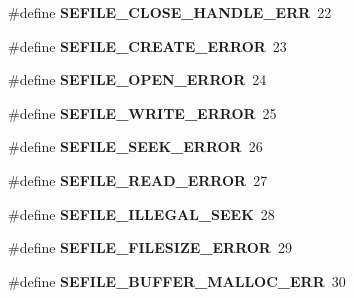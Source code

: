 \begin{DoxyCompactItemize}
\item 
\hypertarget{group__error_values_ga6142dae41abd857c4b8d98e28b33afb7}{\#define {\bfseries S\-E\-F\-I\-L\-E\-\_\-\-C\-L\-O\-S\-E\-\_\-\-H\-A\-N\-D\-L\-E\-\_\-\-E\-R\-R}~22}\label{group__error_values_ga6142dae41abd857c4b8d98e28b33afb7}

\item 
\hypertarget{group__error_values_gab9228a3791ed91c954cb95fb8a022ce4}{\#define {\bfseries S\-E\-F\-I\-L\-E\-\_\-\-C\-R\-E\-A\-T\-E\-\_\-\-E\-R\-R\-O\-R}~23}\label{group__error_values_gab9228a3791ed91c954cb95fb8a022ce4}

\item 
\hypertarget{group__error_values_ga53ed7e1a28f72c836dec4dbde1a863ae}{\#define {\bfseries S\-E\-F\-I\-L\-E\-\_\-\-O\-P\-E\-N\-\_\-\-E\-R\-R\-O\-R}~24}\label{group__error_values_ga53ed7e1a28f72c836dec4dbde1a863ae}

\item 
\hypertarget{group__error_values_ga4f75c01ae99f556170441fdf75dee72c}{\#define {\bfseries S\-E\-F\-I\-L\-E\-\_\-\-W\-R\-I\-T\-E\-\_\-\-E\-R\-R\-O\-R}~25}\label{group__error_values_ga4f75c01ae99f556170441fdf75dee72c}

\item 
\hypertarget{group__error_values_ga17c8f4bc7a1cd110cb0d3c2d854e967e}{\#define {\bfseries S\-E\-F\-I\-L\-E\-\_\-\-S\-E\-E\-K\-\_\-\-E\-R\-R\-O\-R}~26}\label{group__error_values_ga17c8f4bc7a1cd110cb0d3c2d854e967e}

\item 
\hypertarget{group__error_values_ga46ab7b08bd58721fb66aace45f4fb27f}{\#define {\bfseries S\-E\-F\-I\-L\-E\-\_\-\-R\-E\-A\-D\-\_\-\-E\-R\-R\-O\-R}~27}\label{group__error_values_ga46ab7b08bd58721fb66aace45f4fb27f}

\item 
\hypertarget{group__error_values_ga067e414c0566c344a984376900e8e7d8}{\#define {\bfseries S\-E\-F\-I\-L\-E\-\_\-\-I\-L\-L\-E\-G\-A\-L\-\_\-\-S\-E\-E\-K}~28}\label{group__error_values_ga067e414c0566c344a984376900e8e7d8}

\item 
\hypertarget{group__error_values_gabd136bee016febfbfdf5754f186c285d}{\#define {\bfseries S\-E\-F\-I\-L\-E\-\_\-\-F\-I\-L\-E\-S\-I\-Z\-E\-\_\-\-E\-R\-R\-O\-R}~29}\label{group__error_values_gabd136bee016febfbfdf5754f186c285d}

\item 
\hypertarget{group__error_values_ga53f3cd3c21d07ca618485d3f1147fbfc}{\#define {\bfseries S\-E\-F\-I\-L\-E\-\_\-\-B\-U\-F\-F\-E\-R\-\_\-\-M\-A\-L\-L\-O\-C\-\_\-\-E\-R\-R}~30}\label{group__error_values_ga53f3cd3c21d07ca618485d3f1147fbfc}


\end{DoxyCompactItemize}
